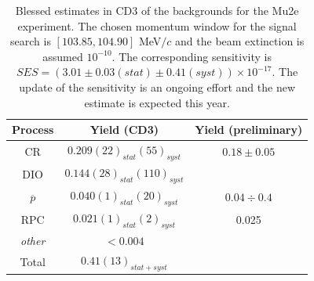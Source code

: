 \documentclass[12pt,a4paper,openright, oneside, titlepage]{book} %
\begin{document}

\begin{table}
\centering
\begin{tabular}{|c|c|c|}
\hline
Process & Yield (CD3) & Yield (preliminary)\\
\hline
\hline
CR	&	$0.209(22)_{stat}(55)_{syst}$ & $0.18\pm0.05$ \cite{CRV_now}\\
\hline
DIO	&	$0.144(28)_{stat}(110)_{syst}$ & \\
\hline
$\overline{p}$	&	$0.040(1)_{stat}(20)_{syst}$ &$0.04 \div 0.4$ \cite{Giovanni:2020}\\
\hline
RPC	&	$0.021(1)_{stat}(2)_{syst}$	& 0.025 \cite{RPC_now} \\
\hline
\textit{other}	& $< 0.004$ &\\
\hline
\hline
Total &	$0.41(13)_{stat+syst}$ &\\
\hline
\end{tabular}
\caption{Blessed estimates in CD3 \cite{CD3} of the backgrounds for the Mu2e experiment.
The chosen momentum window for the signal search is $[103.85, 104.90]$ MeV$/c$ and the beam extinction is assumed $10^{-10}$. 
The corresponding sensitivity is $SES=(3.01 \pm 0.03(stat) \pm 0.41(syst)) \times 10^{-17}$. 
The update of the sensitivity is an ongoing effort and the new estimate is expected this year.}
\label{T_backgrounds}
\end{table}
\end{document}

